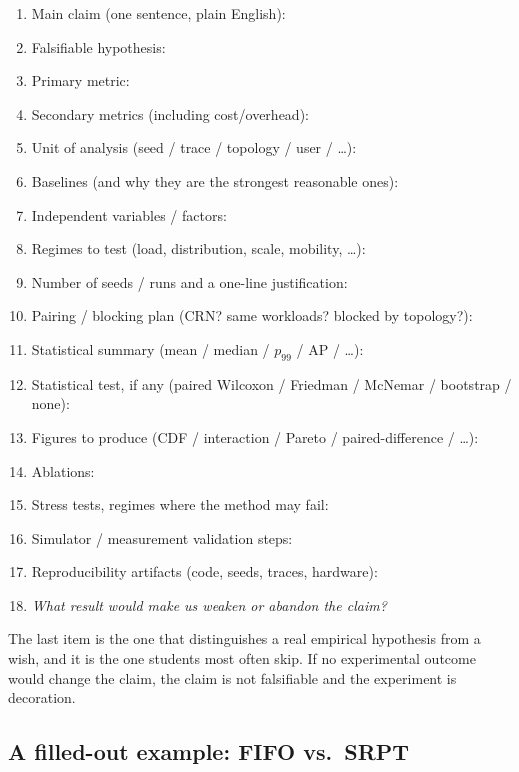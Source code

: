 \documentclass[11pt]{article}
\begin{document}
\begin{enumerate}[leftmargin=*, itemsep=2pt]
    \item Main claim (one sentence, plain English):\wsline
    \item Falsifiable hypothesis:\wsline
    \item Primary metric:\wsline
    \item Secondary metrics (including cost/overhead):\wsline
    \item Unit of analysis (seed / trace / topology / user / \ldots):\wsline
    \item Baselines (and why they are the strongest reasonable ones):\wsline
    \item Independent variables / factors:\wsline
    \item Regimes to test (load, distribution, scale, mobility, \ldots):\wsline
    \item Number of seeds / runs and a one-line justification:\wsline
    \item Pairing / blocking plan (CRN? same workloads? blocked by topology?):\wsline
    \item Statistical summary (mean / median / $p_{99}$ / AP / \ldots):\wsline
    \item Statistical test, if any (paired Wilcoxon / Friedman / McNemar / bootstrap / none):\wsline
    \item Figures to produce (CDF / interaction / Pareto / paired-difference / \ldots):\wsline
    \item Ablations:\wsline
    \item Stress tests, regimes where the method may fail:\wsline
    \item Simulator / measurement validation steps:\wsline
    \item Reproducibility artifacts (code, seeds, traces, hardware):\wsline
    \item \emph{What result would make us weaken or abandon the claim?}\wsline
\end{enumerate}

The last item is the one that distinguishes a real empirical hypothesis
from a wish, and it is the one students most often skip. If no
experimental outcome would change the claim, the claim is not falsifiable
and the experiment is decoration.

\subsection*{A filled-out example: FIFO vs.\ SRPT}
\end{document}
